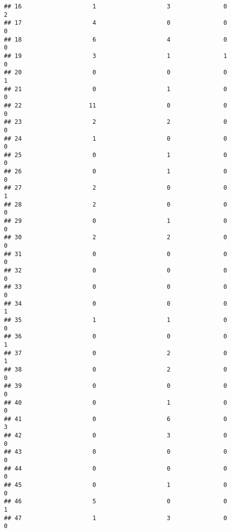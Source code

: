 \documentclass[
]{article}
\begin{document}
\begin{verbatim}
## 16                    1                    3               0                 2
## 17                    4                    0               0                 0
## 18                    6                    4               0                 0
## 19                    3                    1               1                 0
## 20                    0                    0               0                 1
## 21                    0                    1               0                 0
## 22                   11                    0               0                 0
## 23                    2                    2               0                 0
## 24                    1                    0               0                 0
## 25                    0                    1               0                 0
## 26                    0                    1               0                 0
## 27                    2                    0               0                 1
## 28                    2                    0               0                 0
## 29                    0                    1               0                 0
## 30                    2                    2               0                 0
## 31                    0                    0               0                 0
## 32                    0                    0               0                 0
## 33                    0                    0               0                 0
## 34                    0                    0               0                 1
## 35                    1                    1               0                 0
## 36                    0                    0               0                 1
## 37                    0                    2               0                 1
## 38                    0                    2               0                 0
## 39                    0                    0               0                 0
## 40                    0                    1               0                 0
## 41                    0                    6               0                 3
## 42                    0                    3               0                 0
## 43                    0                    0               0                 0
## 44                    0                    0               0                 0
## 45                    0                    1               0                 0
## 46                    5                    0               0                 1
## 47                    1                    3               0                 0

\end{verbatim}
\end{document}
